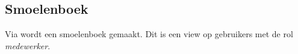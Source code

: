 \subsection{Smoelenboek}\label{smoelenboek}

Via  wordt een smoelenboek gemaakt. Dit is een view op gebruikers met de rol \emph{medewerker}.

